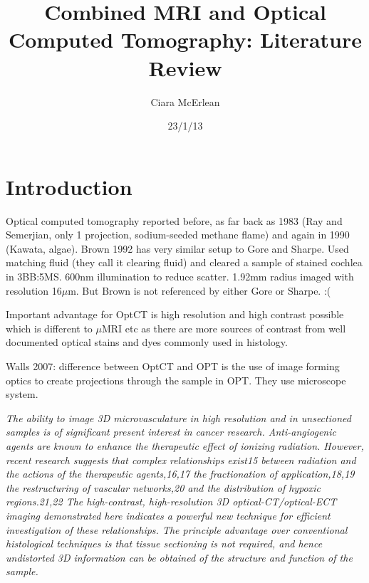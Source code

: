 \documentclass[12pt]{article}
\begin{document}
 
\title{Combined MRI and Optical Computed Tomography: Literature Review} 
\author{Ciara McErlean}
\date{23/1/13} 
\maketitle 

\section{Introduction}
\label{sec:intro}

Optical computed tomography reported before, as far back as 1983 (Ray and Semerjian, only 1 projection, sodium-seeded methane flame)\cite{ray1983laser} and again in 1990 (Kawata, algae)\cite{kawata1990laser}. Brown 1992 \cite{Brown:1992} has very similar setup to Gore and Sharpe. Used matching fluid (they call it clearing fluid) and cleared a sample of stained cochlea in 3BB:5MS. 600nm illumination to reduce scatter. 1.92mm radius imaged with resolution 16$\mu$m. But Brown is not referenced by either Gore or Sharpe. :(

Important advantage for OptCT is high resolution and high contrast possible which is different to $\mu$MRI etc as there are more sources of contrast from well documented optical stains and dyes commonly used in histology. \cite{Oldham:2007ku}


Walls 2007: difference between OptCT and OPT is the use of image forming optics to create projections through the sample in OPT. They use microscope system.

 \textit{The ability to image 3D microvasculature in high resolution and in unsectioned samples is of significant
 present interest in cancer research. Anti-angiogenic agents are known to enhance the
 therapeutic effect of ionizing radiation. However, recent research suggests that complex
 relationships exist15 between radiation and the actions of the therapeutic agents,16,17 the
 fractionation of application,18,19 the restructuring of vascular networks,20 and the distribution
 of hypoxic regions.21,22 The high-contrast, high-resolution 3D optical-CT/optical-ECT
 imaging demonstrated here indicates a powerful new technique for efficient investigation of
 these relationships. The principle advantage over conventional histological techniques is that
 tissue sectioning is not required, and hence undistorted 3D information can be obtained of the
 structure and function of the sample.} \cite{Oldham:2006}
\end{document}
